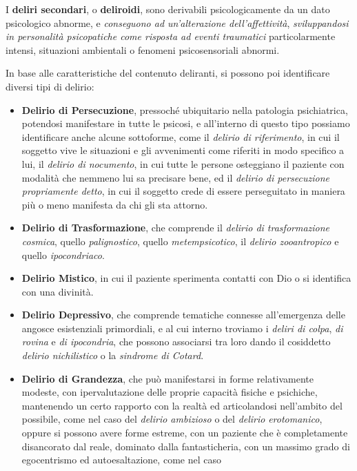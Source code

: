 I \textbf{deliri secondari}, o \textbf{deliroidi}, sono derivabili
psicologicamente da un dato psicologico abnorme, e \emph{conseguono ad
un'alterazione dell'affettività}, \emph{sviluppandosi in personalità
psicopatiche come risposta ad eventi traumatici} particolarmente
intensi, situazioni ambientali o fenomeni psicosensoriali abnormi.

In base alle caratteristiche del contenuto deliranti, si possono poi
identificare diversi tipi di delirio:

\begin{itemize}
\item
  \textbf{Delirio di Persecuzione}, pressoché ubiquitario nella
  patologia psichiatrica, potendosi manifestare in tutte le psicosi, e
  all'interno di questo tipo possiamo identificare anche alcune
  sottoforme, come il \emph{delirio di riferimento}, in cui il soggetto
  vive le situazioni e gli avvenimenti come riferiti in modo specifico a
  lui, il \emph{delirio di nocumento}, in cui tutte le persone
  osteggiano il paziente con modalità che nemmeno lui sa precisare bene,
  ed il \emph{delirio di persecuzione propriamente detto}, in cui il
  soggetto crede di essere perseguitato in maniera più o meno manifesta
  da chi gli sta attorno.
\item
  \textbf{Delirio di Trasformazione}, che comprende il \emph{delirio di
  trasformazione cosmica}, quello \emph{palignostico}, quello
  \emph{metempsicotico}, il \emph{delirio zooantropico} e quello
  \emph{ipocondriaco}.
\item
  \textbf{Delirio Mistico}, in cui il paziente sperimenta contatti con
  Dio o si identifica con una divinità.
\item
  \textbf{Delirio Depressivo}, che comprende tematiche connesse
  all'emergenza delle angosce esistenziali primordiali, e al cui interno
  troviamo i \emph{deliri di colpa}, \emph{di rovina} e \emph{di
  ipocondria}, che possono associarsi tra loro dando il cosiddetto
  \emph{delirio nichilistico} o la \emph{sindrome di Cotard}.
\item
  \textbf{Delirio di Grandezza}, che può manifestarsi in forme
  relativamente modeste, con ipervalutazione delle proprie capacità
  fisiche e psichiche, mantenendo un certo rapporto con la realtà ed
  articolandosi nell'ambito del possibile, come nel caso del
  \emph{delirio ambizioso} o del \emph{delirio} \emph{erotomanico},
  oppure si possono avere forme estreme, con un paziente che è
  completamente disancorato dal reale, dominato dalla fantasticheria,
  con un massimo grado di egocentrismo ed autoesaltazione, come nel caso

\end{itemize}
